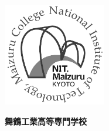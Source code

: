 \vfill
\begin{center}
    \includegraphics[width=45mm]{figure/logo_maizuru_gray.pdf}
\end{center}
\vspace{0.3zh}
\begin{center}
    {\fontsize{22pt}{0pt}\selectfont\bf{舞鶴工業高等専門学校}}\\[1zh]
\end{center}


\thispagestyle{empty}
